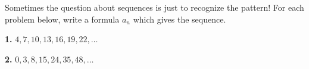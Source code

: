 Sometimes the question about sequences is just to recognize the pattern!  For each problem below, write a formula $a_n$ which gives the sequence.

\medskip \noindent \textbf{1.} \quad $4,7,10,13,16,19,22,\dots$

\vspace{45mm}
\medskip \noindent \textbf{2.} \quad $0,3,8,15,24,35,48,\dots$
